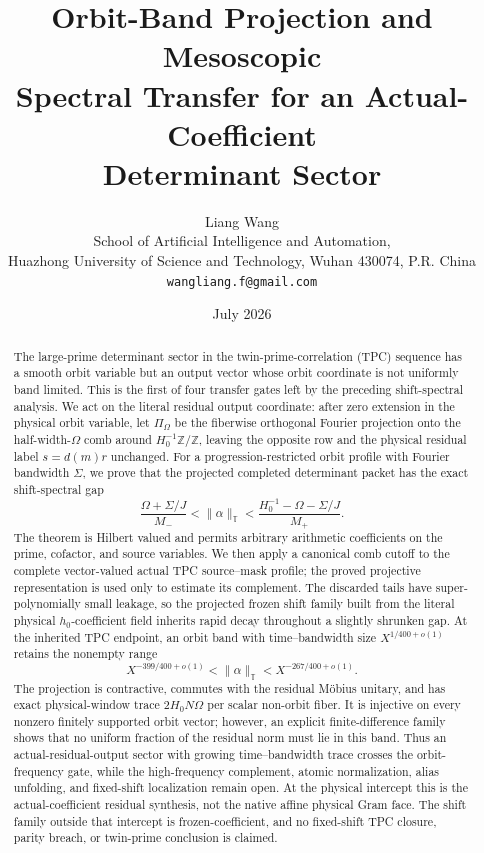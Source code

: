 \documentclass[11pt]{article}
\title{\bfseries Orbit-Band Projection and Mesoscopic\\
Spectral Transfer for an Actual-Coefficient\\
Determinant Sector}
\author{Liang Wang\\
\small School of Artificial Intelligence and Automation,\\[-2pt]
\small Huazhong University of Science and Technology, Wuhan 430074, P.R. China\\
\small \texttt{wangliang.f@gmail.com}}
\date{July 2026}
\theoremstyle{definition}
\theoremstyle{remark}
\begin{document}
\maketitle

\begin{abstract}
The large-prime determinant sector in the twin-prime-correlation (TPC)
sequence has a smooth orbit variable but an output vector whose orbit
coordinate is not uniformly band limited.  This is the first of four
transfer gates left by the preceding shift-spectral analysis.  We act
on the literal residual output coordinate: after zero extension in the
physical orbit variable, let \(\Pi_\Omega\) be the fiberwise orthogonal
 Fourier projection onto the half-width-\(\Omega\) comb around
\(H_0^{-1}\mathbb Z/\mathbb Z\), leaving the opposite row and the
physical residual label \(s=d(m)r\) unchanged.
For a progression-restricted orbit profile with Fourier bandwidth
\(\Sigma\), we prove that the projected completed determinant packet
has the exact shift-spectral gap
\[
 \frac{\Omega+\Sigma/J}{M_-}<\|\alpha\|_{\mathbb T}
 <\frac{H_0^{-1}-\Omega-\Sigma/J}{M_+}.
\]
The theorem is Hilbert valued and permits arbitrary arithmetic
coefficients on the prime, cofactor, and source variables.  We then
apply a canonical comb cutoff to the complete vector-valued
actual TPC source--mask profile; the proved projective representation
is used only to estimate its complement.  The discarded tails have
 super-polynomially small leakage, so the projected frozen shift family
 built from the literal physical \(h_0\)-coefficient field inherits
 rapid decay throughout a slightly shrunken gap.  At the inherited TPC
endpoint, an orbit band with time--bandwidth size
\(X^{1/400+o(1)}\) retains the nonempty range
\[
 X^{-399/400+o(1)}<\|\alpha\|_{\mathbb T}
 <X^{-267/400+o(1)}.
\]
The projection is contractive, commutes with the residual M\"obius
unitary, and has exact physical-window trace \(2H_0N\Omega\) per
scalar non-orbit fiber.  It is
injective on every nonzero finitely supported orbit vector; however,
an explicit finite-difference family shows that no uniform fraction of
 the residual norm must lie in this band.  Thus an
 actual-residual-output sector with growing time--bandwidth trace crosses
 the orbit-frequency gate, while the
high-frequency complement, atomic normalization, alias unfolding, and
fixed-shift localization remain open.  At the physical intercept this
is the actual-coefficient residual synthesis, not the native affine
physical Gram face.  The shift family outside that intercept is
frozen-coefficient, and no fixed-shift TPC closure,
parity breach, or twin-prime conclusion is claimed.
\end{abstract}
\end{document}
